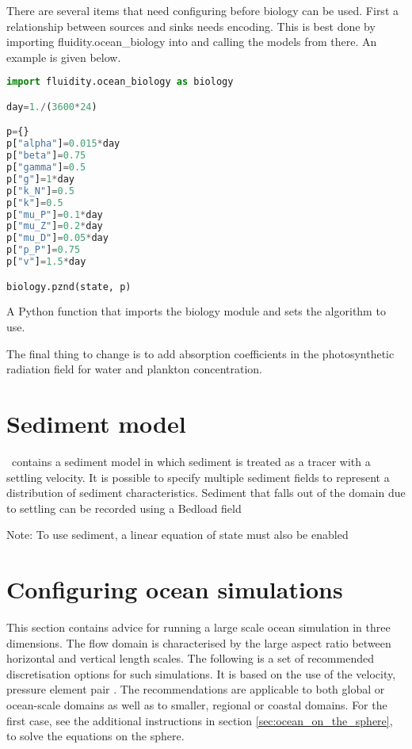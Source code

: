 There are several items that need configuring before biology can be used.
First a relationship between sources and sinks needs encoding. This is best
done by importing fluidity.ocean\_biology into
 and calling the
models from there. An example is given below.

\begin{example}
  \begin{lstlisting}[language=Python]
import fluidity.ocean_biology as biology

day=1./(3600*24)

p={}
p["alpha"]=0.015*day
p["beta"]=0.75
p["gamma"]=0.5
p["g"]=1*day
p["k_N"]=0.5
p["k"]=0.5
p["mu_P"]=0.1*day
p["mu_Z"]=0.2*day
p["mu_D"]=0.05*day
p["p_P"]=0.75
p["v"]=1.5*day

biology.pznd(state, p)  
  \end{lstlisting}
  \caption{A Python function that imports the biology module and sets the algorithm to use.}
\end{example}

The final thing to change is to add absorption coefficients in the photosynthetic radiation field for water and plankton concentration.

\section{Sediment model}
\label{config:sediments}

\fluidity\ contains a sediment model in which sediment is treated as a
tracer with a settling velocity. 
It is possible to specify multiple sediment fields to represent a distribution of sediment
characteristics.
Sediment that falls out of the domain due to settling can be recorded using a
Bedload field

Note: To use sediment, a linear equation of state must also be enabled

\section{Configuring ocean simulations}
\label{sec:large-scale-ocean}

This section contains advice for running a large scale ocean simulation in
three dimensions. The flow domain is characterised by the large aspect ratio
between horizontal and vertical length scales. The following is a set of
recommended discretisation options for such simulations. It is based on the use
of the \PoDGPt velocity, pressure element pair \citep{cotter2009}. The
recommendations are applicable to both global or ocean-scale domains as well as
to smaller, regional or coastal domains. For the first case, see the additional
instructions in section \ref{sec:ocean_on_the_sphere}, to solve the equations
on the sphere.


